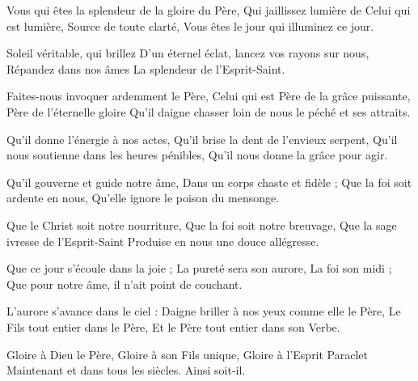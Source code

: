 Vous qui êtes la splendeur de la gloire du Père,
Qui jaillissez lumière de Celui qui est lumière,
Source de toute clarté,
Vous êtes le jour qui illuminez ce jour.

Soleil véritable, qui brillez
D'un éternel éclat, lancez vos rayons sur nous,
Répandez dans nos âmes
La splendeur de l'Esprit-Saint.

Faites-nous invoquer ardemment le Père,
Celui qui est Père de la grâce puissante,
Père de l'éternelle gloire
Qu'il daigne chasser loin de nous le péché et ses attraits.

Qu'il donne l'énergie à nos actes,
Qu'il brise la dent de l'envieux serpent,
Qu'il nous soutienne dans les heures pénibles,
Qu'il nous donne la grâce pour agir.

Qu'il gouverne et guide notre âme,
Dans un corps chaste et fidèle ;
Que la foi soit ardente en nous,
Qu'elle ignore le poison du mensonge.

Que le Christ soit notre nourriture,
Que la foi soit notre breuvage,
Que la sage ivresse de l'Esprit-Saint
Produise en nous une douce allégresse.

Que ce jour s'écoule dans la joie ;
La pureté sera son aurore,
La foi son midi ;
Que pour notre âme, il n'ait point de couchant.

L'aurore s'avance dans le ciel :
Daigne briller à nos yeux comme elle le Père,
Le Fils tout entier dans le Père,
Et le Père tout entier dans son Verbe.

Gloire à Dieu le Père,
Gloire à son Fils unique,
Gloire à l'Esprit Paraclet
Maintenant et dans tous les siècles.
Ainsi soit-il.
